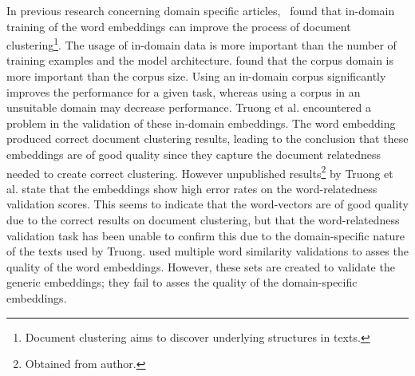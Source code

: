 \documentclass[../../Thesis.tex]{subfiles}
\begin{document}
In previous research concerning domain specific articles,~\citet{Truong2017Thesis} found that in-domain training of the word embeddings can improve the process of document clustering\footnote{Document clustering aims to discover underlying structures in texts\citet{Truong2017Thesis}.}. The usage of in-domain data is more important than the number of training examples and the model architecture\cite{Truong2017Thesis}. \citet{lai2016generate} found that the corpus domain is more important than the corpus size. Using an in-domain corpus significantly improves the performance for a given task, whereas using a corpus in an unsuitable domain may decrease performance.
Truong et al. encountered a problem in the validation of these in-domain embeddings. The word embedding produced correct document clustering results, leading to the conclusion that these embeddings are of good quality since they capture the document relatedness needed to create correct clustering. However unpublished results\footnote{Obtained from author.} by Truong et al. state that the embeddings show high error rates on the word-relatedness validation scores. This seems to indicate that the word-vectors are of good quality due to the correct results on document clustering, but that the word-relatedness validation task has been unable to confirm this due to the domain-specific nature of the texts used by Truong. \citet{Truong2017Thesis} used multiple word similarity validations to asses the quality of the word embeddings. However, these sets are created to validate the generic embeddings; they fail to asses the quality of the domain-specific embeddings.
\end{document}
